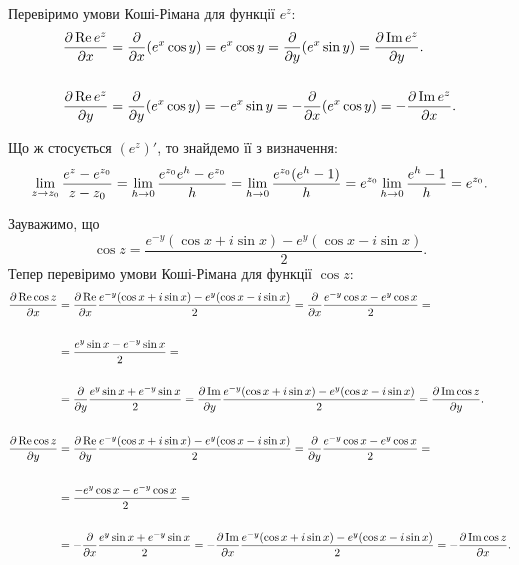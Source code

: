 \begin{solution}
    Перевіримо умови Коші-Рімана для функції $e^z$:
    \begin{align*}
        \dfrac{\partial \operatorname{Re} e^z}{\partial x} &= \dfrac{\partial}{\partial x}(e^x \cos y) = e^x \cos y = \dfrac{\partial}{\partial y} (e^x \sin y) = \dfrac{\partial \operatorname{Im} e^z}{\partial y}. \\
        \\
        \dfrac{\partial \operatorname{Re} e^z}{\partial y} &= \dfrac{\partial}{\partial y}(e^x \cos y) = - e^x \sin y = - \dfrac{\partial}{\partial x} (e^x \cos y) = - \dfrac{\partial \operatorname{Im} e^z}{\partial x}.
    \end{align*}
    
    Що ж стосується $(e^z)'$, то знайдемо її з визначення: 
    \[ \displaystyle\lim\limits_{z \to z_0} \dfrac{e^z - e^{z_0}}{z - z_0} = \displaystyle\lim\limits_{h \to 0} \dfrac{e^{z_0} e^h - e^{z_0}}{h} = \displaystyle\lim\limits_{h \to 0} \dfrac{e^{z_0} (e^h - 1)}{h} = e^{z_0} \displaystyle\lim\limits_{h \to 0} \dfrac{e^h - 1}{h} = e^{z_0}. \]
    
    Зауважимо, що 
    \[\cos z = \dfrac{e^{-y} (\cos x + i \sin x) - e^{y}(\cos x - i \sin x)}{2}.\]
    Тепер перевіримо умови Коші-Рімана для функції $\cos z$:
    \begin{align*}
        \dfrac{\partial \operatorname{Re} \cos z}{\partial x} &= \dfrac{\partial \operatorname{Re}}{\partial x} \dfrac{e^{-y}(\cos x + i \sin x) - e^{y}(\cos x - i \sin x)}{2} = \dfrac{\partial}{\partial x} \dfrac{e^{-y} \cos x - e^{y} \cos x}{2} = \\
        \\
        &= \dfrac{e^{y} \sin x - e^{-y} \sin x}{2} = \\
        \\
        &= \dfrac{\partial}{\partial y} \dfrac{e^{y} \sin x + e^{-y} \sin x}{2} = \dfrac{\partial \operatorname{Im}}{\partial y} \dfrac{e^{-y}(\cos x + i \sin x) - e^{y}(\cos x - i \sin x)}{2} = \dfrac{\partial \operatorname{Im} \cos z}{\partial y}. \\
        \\
        \dfrac{\partial \operatorname{Re} \cos z}{\partial y} &= \dfrac{\partial \operatorname{Re}}{\partial y} \dfrac{e^{-y}(\cos x + i \sin x) - e^{y}(\cos x - i \sin x)}{2} = \dfrac{\partial}{\partial y} \dfrac{e^{-y} \cos x - e^{y} \cos x}{2} = \\
        \\
        &= \dfrac{-e^{y} \cos x - e^{-y} \cos x}{2} = \\
        \\
        &= - \dfrac{\partial}{\partial x} \dfrac{e^{y} \sin x + e^{-y} \sin x}{2} = - \dfrac{\partial \operatorname{Im}}{\partial x} \dfrac{e^{-y}(\cos x + i \sin x) - e^{y}(\cos x - i \sin x)}{2} = - \dfrac{\partial \operatorname{Im} \cos z}{\partial x}.
    \end{align*}
    

\end{solution}
